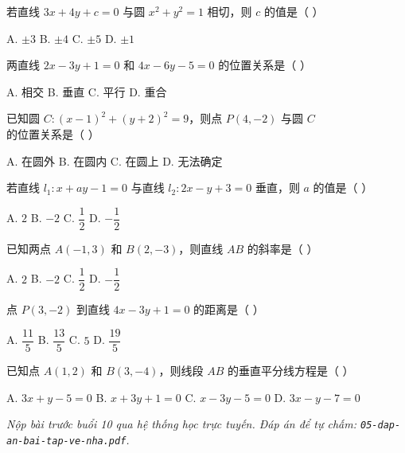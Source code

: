 \documentclass[11pt, a4paper]{article}
\begin{document}
\begin{baitap}[9]
若直线 $3x + 4y + c = 0$ 与圆 $x^2 + y^2 = 1$ 相切，则 $c$ 的值是（ ）
\par\vspace{3pt}
\noindent A. $\pm 3$ \quad B. $\pm 4$ \quad C. $\pm 5$ \quad D. $\pm 1$
\end{baitap}

\begin{baitap}[10]
两直线 $2x - 3y + 1 = 0$ 和 $4x - 6y - 5 = 0$ 的位置关系是（ ）
\par\vspace{3pt}
\noindent A. 相交 \quad B. 垂直 \quad C. 平行 \quad D. 重合
\end{baitap}

\begin{baitap}[11]
已知圆 $C: (x-1)^2 + (y+2)^2 = 9$，则点 $P(4,-2)$ 与圆 $C$ 的位置关系是（ ）
\par\vspace{3pt}
\noindent A. 在圆外 \quad B. 在圆内 \quad C. 在圆上 \quad D. 无法确定
\end{baitap}

\begin{baitap}[12]
若直线 $l_1: x + ay - 1 = 0$ 与直线 $l_2: 2x - y + 3 = 0$ 垂直，则 $a$ 的值是（ ）
\par\vspace{3pt}
\noindent A. $2$ \quad B. $-2$ \quad C. $\dfrac{1}{2}$ \quad D. $-\dfrac{1}{2}$
\end{baitap}

\begin{baitap}[13]
已知两点 $A(-1,3)$ 和 $B(2,-3)$，则直线 $AB$ 的斜率是（ ）
\par\vspace{3pt}
\noindent A. $2$ \quad B. $-2$ \quad C. $\dfrac{1}{2}$ \quad D. $-\dfrac{1}{2}$
\end{baitap}

\begin{baitap}[14]
点 $P(3,-2)$ 到直线 $4x - 3y + 1 = 0$ 的距离是（ ）
\par\vspace{3pt}
\noindent A. $\dfrac{11}{5}$ \quad B. $\dfrac{13}{5}$ \quad C. $5$ \quad D. $\dfrac{19}{5}$
\end{baitap}

\begin{baitap}[15]
已知点 $A(1,2)$ 和 $B(3,-4)$，则线段 $AB$ 的垂直平分线方程是（ ）
\par\vspace{3pt}
\noindent A. $3x + y - 5 = 0$ \quad B. $x + 3y + 1 = 0$ \quad C. $x - 3y - 5 = 0$ \quad D. $3x - y - 7 = 0$
\end{baitap}

\vspace{0.3cm}
\noindent\emph{Nộp bài trước buổi 10 qua hệ thống học trực tuyến. Đáp án để tự chấm: \texttt{05-dap-an-bai-tap-ve-nha.pdf}.}
\end{document}

